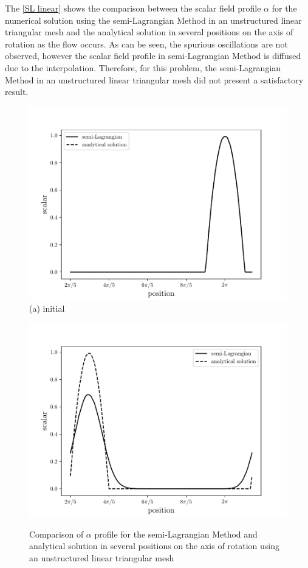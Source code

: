 \medskip
The \ref{SL linear} shows the comparison between the scalar field
profile $\alpha$ for the numerical solution using the semi-Lagrangian 
Method in an unstructured linear triangular mesh 
and the analytical solution in 
several positions on the axis of rotation as the flow occurs. 
As can be seen, the spurious oscillations are not observed,
however the scalar field profile in semi-Lagrangian Method
is diffused due to the interpolation. Therefore, for this problem,
the semi-Lagrangian Method in an unstructured linear triangular mesh
did not present a satisfactory result.


\begin{center}
\begin{figure}[H]
     \caption{Comparison of $\alpha$ profile for the semi-Lagrangian Method and analytical solution in several positions on the axis of rotation using an unstructured linear triangular mesh} 
     \centering
     \begin{minipage}{.5\linewidth}
      \centering
      \includegraphics[scale=0.53]{./02_chaps/cap_validation/figure/SLlinear0.pdf}\\
      (a) initial
     \end{minipage}%
     \begin{minipage}{.5\linewidth}
      \centering
      \includegraphics[scale=0.53]{./02_chaps/cap_validation/figure/SLlinear1.pdf}\\

\end{minipage}
\end{figure}
\end{center}
